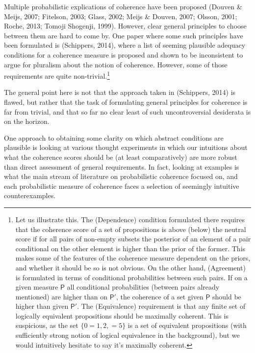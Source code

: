 \documentclass[
  10pt,
]{scrartcl}
\begin{document}
Multiple probabilistic explications of coherence have been proposed
(Douven \& Meijs, 2007; Fitelson, 2003; Glass, 2002; Meijs \& Douven, 2007; Olsson, 2001; Roche, 2013; Tomoji Shogenji, 1999). However, clear general principles to choose between them are hard to come by. One paper where some such principles have been formulated is (Schippers, 2014), where a list of seeming plausible adequacy conditions for a coherence measure is proposed and shown to be inconsistent to argue for pluralism about the notion of coherence. However, some of those requirements are quite non-trivial.\footnote{Let us illustrate this. The (Dependence) condition formulated there requires that the coherence score of a set of propositions is above (below) the neutral score if for all pairs of non-empty subsets the posterior of an element of a pair conditional on the other element is higher than the prior of the former. This makes some of the features of the coherence measure dependent on the priors, and whether it should be so is not obvious. On the other hand, (Agreement) is formulated in terms of conditional probabilities between such pairs. If on a given measure \(\mathsf{P}\) all conditional probabilities (between pairs already mentioned) are higher than on \(\mathsf{P}'\), the coherence of a set given \(\mathsf{P}\) should be higher than given \(\mathsf{P}'\). The (Equivalence) requirement is that any finite set of logically equivalent propositions should be maximally coherent. This is suspicious, as the set \(\{ 0= 1, 2, = 5\}\) is a set of equivalent propositions (with sufficiently strong notion of logical equivalence in the background), but we would intuitively hesitate to say it's maximally coherent.}

The general point here is not that the approach taken in (Schippers, 2014) is flawed, but rather that the task of formulating general principles for coherence is far from trivial, and that so far no clear least of such uncontroversial desiderata is on the horizon.

One approach to obtaining some clarity on which abstract conditions are plausible is looking at various thought experiments in which our intuitions about what the coherence scores should be (at least comparatively) are more robust than direct assessment of general requirements. In fact, looking at examples is what the main stream of literature on probabilistic coherence focused on, and each probabilistic measure of coherence faces a selection of seemingly intuitive counterexamples.
\end{document}
